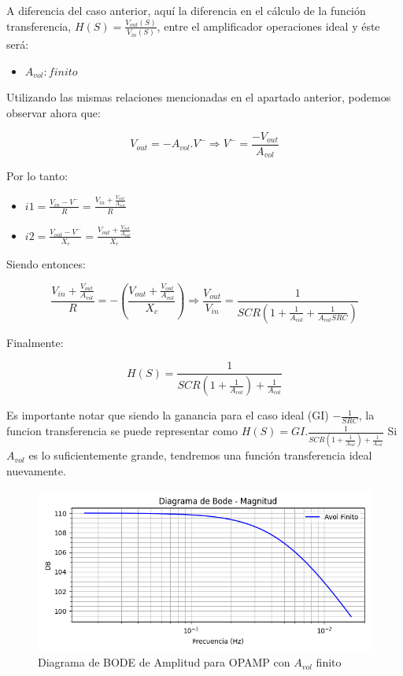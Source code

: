 A diferencia del caso anterior, aquí la diferencia en el cálculo de la función transferencia, $H(S) = \frac{V_{out} (S)}{V_{in} (S)}$,
entre el amplificador operaciones ideal y éste será:

\begin{itemize}
	\item $A_{vol}: finito$
\end{itemize}

Utilizando las mismas relaciones mencionadas en el apartado anterior, podemos observar ahora que:


$$V_{out}=-A_{vol}.V^{-} \Longrightarrow V^{-} = \frac{-V_{out}}{A_{vol}}$$ 


Por lo tanto:

\begin{itemize}
	\item $i1 = \frac {V_{in}-V^{-}}{R} =  \frac {V_{in} + \frac{V_{out}}{A_{vol}}}{R}$
	\item $i2 = \frac {V_{out}-V^{-}}{X_c} = \frac {V_{out} + \frac{V_{out}}{A_{vol}}}{X_c}$
\end{itemize}

Siendo entonces:

$$ \frac {V_{in} + \frac{V_{out}}{A_{vol}}}{R} = -(\frac {V_{out} + \frac{V_{out}}{A_{vol}}}{X_c})
\Longrightarrow \frac{V_{out}}{V_{in}} = \frac{1}{SCR(1+\frac{1}{A_{vol}}+\frac{1}{A_{vol}SRC})}$$

Finalmente:

$$H(S)= \frac{1}{SCR(1+\frac{1}{A_{vol}})+\frac{1}{A_{vol}}}$$

Es importante notar que siendo la ganancia para el caso ideal (GI) $- \frac{1}{SRC}$,  la funcion
transferencia se puede representar como $H(S) = GI. \frac{1}{SCR(1+\frac{1}{A_{vol}})+\frac{1}{A_{vol}}}$
Si $A_{vol}$ es lo suficientemente grande, tendremos una función transferencia ideal nuevamente.

\begin{figure}[H]
    \centering 
    \includegraphics [scale=1] {../Ejercicio3-CircuitoIntegradoresyDerivadores/Imagenes/diagrama-bode-cideal-amplitud.png} 
    \caption{Diagrama de BODE de Amplitud para OPAMP con $A_{vol}$ finito}
    \label{fig:emptyPlotTool}
\end{figure}

